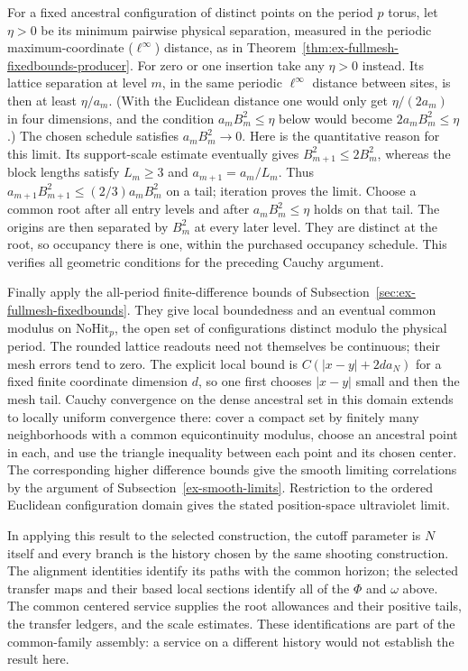 For a fixed ancestral configuration of distinct points on the period
$p$ torus, let $\eta>0$ be its minimum pairwise physical separation,
measured in the periodic maximum-coordinate ($\ell^\infty$) distance, as in
Theorem~\ref{thm:ex-fullmesh-fixedbounds-producer}.
For zero or one insertion take any $\eta>0$ instead.
Its lattice separation at level $m$, in the same periodic $\ell^\infty$
distance between sites, is then at least $\eta/a_m$. (With the Euclidean
distance one would only get $\eta/(2a_m)$ in four dimensions, and the
condition $a_mB_m^2\le\eta$ below would become $2a_mB_m^2\le\eta$.)
The chosen schedule satisfies $a_mB_m^2\to0$.
Here is the quantitative reason for this limit.
Its support-scale estimate eventually gives $B_{m+1}^2\le2B_m^2$,
whereas the block lengths satisfy $L_m\ge3$ and
$a_{m+1}=a_m/L_m$. Thus $a_{m+1}B_{m+1}^2\le
(2/3)a_mB_m^2$ on a tail; iteration proves the limit.
Choose a common root after all entry levels and after
$a_mB_m^2\le\eta$ holds on that tail. The origins are then
separated by $B_m^2$ at every later level. They are distinct at the
root, so occupancy there is one, within the purchased occupancy
schedule. This verifies all geometric conditions for the preceding
Cauchy argument.

Finally apply the all-period finite-difference bounds of
Subsection~\ref{sec:ex-fullmesh-fixedbounds}. They give local boundedness and an eventual common modulus on
$\mathrm{NoHit}_p$, the open set of configurations distinct modulo the
physical period. The rounded lattice readouts need not themselves be
continuous; their mesh errors tend to zero. The explicit local bound is
$C(|x-y|+2d a_N)$ for a fixed finite coordinate dimension $d$,
so one first chooses $|x-y|$ small and then the mesh tail. Cauchy convergence on the dense ancestral set in this domain extends
to locally uniform convergence there: cover a compact set by finitely
many neighborhoods with a common equicontinuity modulus, choose an
ancestral point in each, and use the triangle inequality between each
point and its chosen center. The corresponding higher difference
bounds give the smooth limiting correlations by the argument of
Subsection~\ref{ex-smooth-limits}. Restriction to the ordered Euclidean
configuration domain gives the stated position-space ultraviolet
limit.

In applying this result to the selected construction, the cutoff
parameter is $N$ itself and every branch is the history chosen by the
same shooting construction. The alignment identities identify its
paths with the common horizon; the selected transfer maps and their
based local sections identify all of the $\Phi$ and $\omega$ above.
The common centered service supplies the root allowances and their
positive tails, the transfer ledgers, and the scale estimates.
These identifications are part of the common-family assembly: a
service on a different history would not establish the result here.

